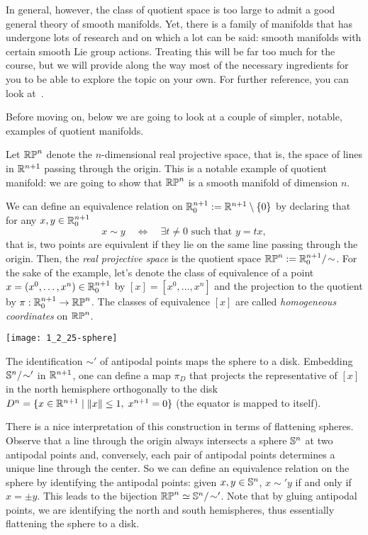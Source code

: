 In general, however, the class of quotient space is too large to admit a good general theory of smooth manifolds.
Yet, there is a family of manifolds that has undergone lots of research and on which a lot can be said: smooth manifolds with certain smooth Lie group actions.
Treating this will be far too much for the course, but we will provide along the way most of the necessary ingredients for you to be able to explore the topic on your own.
For further reference, you can look at~\cite[Chapter 21]{book:lee}.

Before moving on, below we are going to look at a couple of simpler, notable, examples of quotient manifolds.

\begin{example}
  Let $\mathbb{RP}^n$ denote the $n$-dimensional real projective space, that is, the space of lines in $\mathbb{R}^{n+1}$ passing through the origin.
  This is a notable example of quotient manifold: we are going to show that $\mathbb{RP}^n$ is a smooth manifold of dimension $n$.

  We can define an equivalence relation on $\mathbb{R}^{n+1}_0:=\mathbb{R}^{n+1}\setminus\{0\}$ by declaring that for any $x,y\in \mathbb{R}^{n+1}_0$
  \begin{equation}
    x\sim y \quad\Longleftrightarrow\quad \exists t\neq 0 \mbox{ such that } y=tx,
  \end{equation}
  that is, two points are equivalent if they lie on the same line passing through the origin.
  Then, the \emph{real projective space} is the quotient space $\mathbb{RP}^n := \mathbb{R}^{n+1}_0/\!\sim$.
  For the sake of the example, let's denote the class of equivalence of a point $x=(x^0,\ldots,x^n)\in\mathbb{R}^{n+1}_0$ by $[x]=[x^0,\ldots,x^n]$ and the projection to the quotient by $\pi:\mathbb{R}^{n+1}_0\to\mathbb{RP}^n$.
  The classes of equivalence $[x]$ are called \emph{homogeneous coordinates} on $\mathbb{RP}^n$.

  \begin{marginfigure}
    \texttt{[image: 1\_2\_25-sphere]}
    \caption{The identification $\sim'$ of antipodal points maps the sphere to a disk. Embedding $\mathbb{S}^n/\!\sim'$ in $\mathbb{R}^{n+1}$, one can define a map $\pi_D$ that projects the representative of $[x]$ in the north hemisphere orthogonally to the disk $D^n = \{x\in\mathbb{R}^{n+1} \mid \|x\|\leq 1, \; x^{n+1}=0\}$ (the equator is mapped to itself). }
  \end{marginfigure}
  There is a nice interpretation of this construction in terms of flattening spheres.
  Observe that a line through the origin always intersects a sphere $\mathbb{S}^n$ at two antipodal points and, conversely, each pair of antipodal points determines a unique line through the center.
  So we can define an equivalence relation on the sphere by identifying the antipodal points: given $x,y\in\mathbb{S}^n$, $x\sim' y$ if and only if $x = \pm y$.
  This leads to the bijection $\mathbb{RP}^n \simeq \mathbb{S}^n/\!\sim'$.
  Note that by gluing antipodal points, we are identifying the north and south hemispheres, thus essentially flattening the sphere to a disk.


\end{example}
